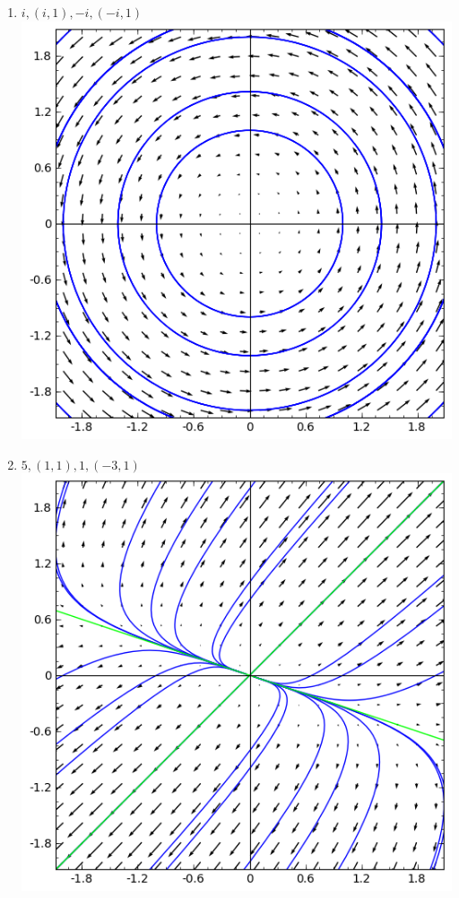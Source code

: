 {\begin{multicols}{2}
\begin{enumerate}
\begin{enumerate}
\item $i, (i,1),  -i, (-i,1)$\\\includegraphics[width=\myvfwidth]{02-Applications/support/vfc}
\item $5, (1,1),  1, (-3,1)$\\\includegraphics[width=\myvfwidth]{02-Applications/support/vfd}

\end{enumerate}
\end{enumerate}
\end{multicols}}
